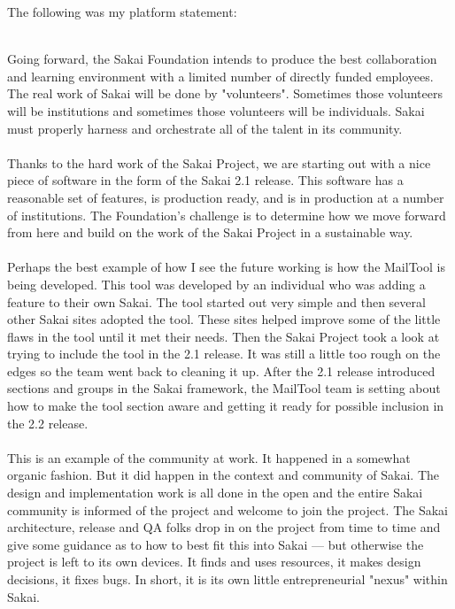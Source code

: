 \documentclass[12pt]{book}
\begin{document}
The following was my platform statement:\\
\\
\begin{sf}
Going forward, the Sakai Foundation intends to produce the best collaboration and learning environment with a limited number of directly funded employees. The real work of Sakai will be done by "volunteers". Sometimes those volunteers will be institutions and sometimes those volunteers will be individuals. Sakai must properly harness and orchestrate all of the talent in its community.\\
\\
Thanks to the hard work of the Sakai Project, we are starting out with a nice piece of software in the form of the Sakai 2.1 release. This software has a reasonable set of features, is production ready, and is in production at a number of institutions. The Foundation's challenge is to determine how we move forward from here and build on the work of the Sakai Project in a sustainable way.\\
\\
Perhaps the best example of how I see the future working is how the MailTool is being developed. This tool was developed by an individual who was adding a feature to their own Sakai. The tool started out very simple and then several other Sakai sites adopted the tool. These sites helped improve some of the little flaws in the tool until it met their needs. Then the Sakai Project took a look at trying to include the tool in the 2.1 release.  It was still a little too rough on the edges so the team went back to cleaning it up. After the 2.1 release introduced sections and groups in the Sakai framework, the MailTool team is setting about how to make the tool section aware and getting it ready for possible inclusion in the 2.2 release.\\
\\
This is an example of the community at work. It happened in a somewhat organic fashion. But it did happen in the context and community of Sakai. The design and implementation work is all done in the open and the entire Sakai community is informed of the project and welcome to join the project. The Sakai architecture, release and QA folks drop in on the project from time to time and give some guidance as to how to best fit this into Sakai --- but otherwise the project is left to its own devices. It finds and uses resources, it makes design decisions, it fixes bugs. In short, it is its own little entrepreneurial "nexus" within Sakai.\\

\end{sf}
\end{document}
